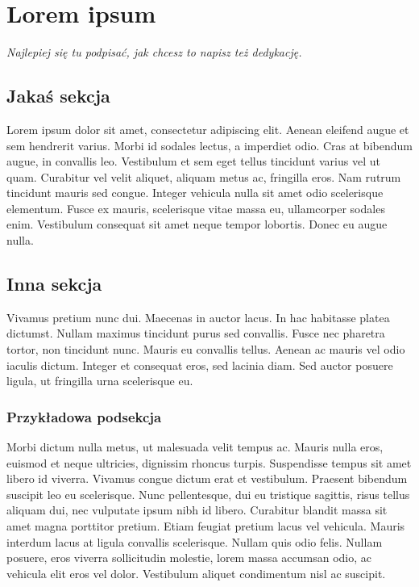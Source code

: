 \renewcommand{\autor}{Jan Kowalski}
\chapter{Lorem ipsum}
\textit{Najlepiej się tu podpisać, jak chcesz to napisz też dedykację.}
\section{Jakaś sekcja}
Lorem ipsum dolor sit amet, consectetur adipiscing elit. Aenean eleifend augue et sem hendrerit varius. Morbi id sodales lectus, a imperdiet odio. Cras at bibendum augue, in convallis leo. Vestibulum et sem eget tellus tincidunt varius vel ut quam. Curabitur vel velit aliquet, aliquam metus ac, fringilla eros. Nam rutrum tincidunt mauris sed congue. Integer vehicula nulla sit amet odio scelerisque elementum. Fusce ex mauris, scelerisque vitae massa eu, ullamcorper sodales enim. Vestibulum consequat sit amet neque tempor lobortis. Donec eu augue nulla.
\section{Inna sekcja}
Vivamus pretium nunc dui. Maecenas in auctor lacus. In hac habitasse platea dictumst. Nullam maximus tincidunt purus sed convallis. Fusce nec pharetra tortor, non tincidunt nunc. Mauris eu convallis tellus. Aenean ac mauris vel odio iaculis dictum. Integer et consequat eros, sed lacinia diam. Sed auctor posuere ligula, ut fringilla urna scelerisque eu.
\subsection{Przykładowa podsekcja}
Morbi dictum nulla metus, ut malesuada velit tempus ac. Mauris nulla eros, euismod et neque ultricies, dignissim rhoncus turpis. Suspendisse tempus sit amet libero id viverra. Vivamus congue dictum erat et vestibulum. Praesent bibendum suscipit leo eu scelerisque. Nunc pellentesque, dui eu tristique sagittis, risus tellus aliquam dui, nec vulputate ipsum nibh id libero. Curabitur blandit massa sit amet magna porttitor pretium. Etiam feugiat pretium lacus vel vehicula. Mauris interdum lacus at ligula convallis scelerisque. Nullam quis odio felis. Nullam posuere, eros viverra sollicitudin molestie, lorem massa accumsan odio, ac vehicula elit eros vel dolor. Vestibulum aliquet condimentum nisl ac suscipit.
